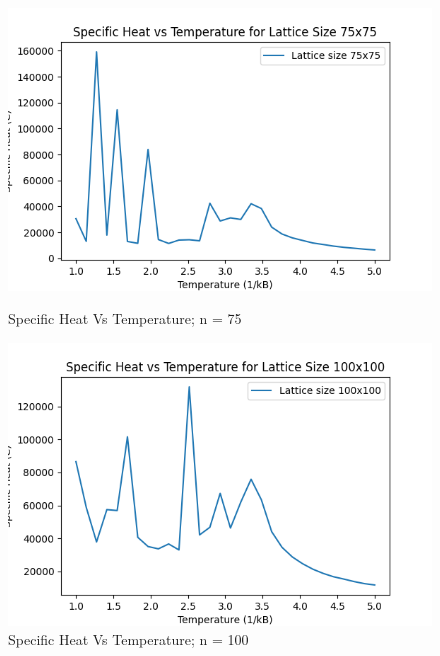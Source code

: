 \documentclass[11pt]{article}
\begin{document}
\begin{figure}[H]
    \centering
    \begin{minipage}{0.48\textwidth}
        \centering
        \includegraphics[width=\textwidth]{Specific_Heat_vs_Temperature_n75.png}
        \caption{Specific Heat Vs Temperature; n = 75}
        \label{fig:27}
    \end{minipage}\hfill %
    \begin{minipage}{0.48\textwidth}
        \centering
        \includegraphics[width=\textwidth]{Specific_Heat_vs_Temperature_n100.png}
        \caption{Specific Heat Vs Temperature; n = 100}
        \label{fig:28}
    \end{minipage}
\end{figure}
\end{document}
